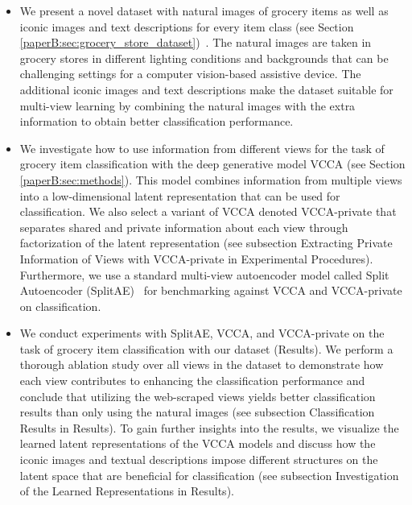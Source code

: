 \begin{itemize}[topsep=1pt, leftmargin=*] 
    \item We present a novel dataset with natural images of grocery items as well as iconic images and text descriptions for every item class (see Section 
    \ref{paperB:sec:grocery_store_dataset})~.
    The natural images are taken in grocery stores in different lighting conditions and backgrounds that can be challenging settings for a computer vision-based assistive device. The additional iconic images and text descriptions make the dataset suitable for multi-view learning by combining the natural images with the extra information to obtain better classification performance.  
    
    \item We investigate how to use information from different views for the task of grocery item classification with the deep generative model VCCA (see Section \ref{paperB:sec:methods}). %
    This model combines information from multiple views into a low-dimensional latent representation that can be used for classification. We also select a variant of VCCA denoted VCCA-private that separates shared and private information about each view through factorization of the latent representation (see subsection Extracting Private Information of Views with VCCA-private in Experimental Procedures). 
    Furthermore, we use a standard multi-view autoencoder model called Split Autoencoder (SplitAE)~ for benchmarking against VCCA and VCCA-private on classification.
    
    \item We conduct experiments with SplitAE, VCCA, and VCCA-private on the task of grocery item classification with our dataset (Results).
    We perform a thorough ablation study over all views in the dataset to demonstrate how each view contributes to enhancing the classification performance and conclude that utilizing the web-scraped views yields better classification results than only using the natural images (see subsection Classification Results in Results).
    To gain further insights into the results, we visualize the learned latent representations of the VCCA models and discuss how the iconic images and textual descriptions impose different structures on the latent space that are beneficial for classification (see subsection Investigation of the Learned Representations in Results).
    
\end{itemize}
